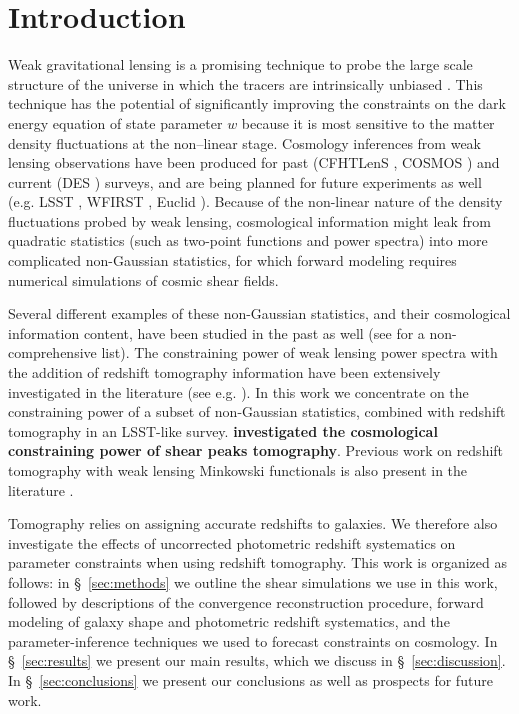 \documentclass[reprint,aps,prd,superscriptaddress,showkeys,showpacs]{revtex4-1}
\begin{document}
\maketitle



\section{Introduction}
%
Weak gravitational lensing is a promising technique to probe the large scale structure of the universe in which the tracers are intrinsically unbiased \citep{wlreview}. This technique has the potential of significantly improving the constraints on the dark energy equation of state parameter $w$ because it is most sensitive to the matter density fluctuations at the non--linear stage. Cosmology inferences from weak lensing observations have been produced for past (CFHTLenS \citep{cfht1}, COSMOS \citep{cosmos}) and current (DES \citep{DES}) surveys, and are being planned for future experiments as well (e.g. LSST \citep{LSST}, WFIRST \citep{WFIRST}, Euclid \citep{Euclid}). Because of the non-linear nature of the density fluctuations probed by weak lensing, cosmological information might leak from quadratic statistics (such as two-point functions and power spectra) into more complicated non-Gaussian statistics, for which forward modeling requires numerical simulations of cosmic shear fields. 

Several different examples of these non-Gaussian statistics, and their cosmological information content, have been studied in the past as well (see \citep{MinkJan,PeaksJan,NG-Marian,NG-Jain1,NG-Jain2,NG-Jain3,NG-Refregier,NG-Dietrich} for a non-comprehensive list). The constraining power of weak lensing power spectra with the addition of redshift tomography information have been extensively investigated in the literature (see e.g. \citep{SongKnox,FangHaiman07,Huterer2006}). In this work we concentrate on the constraining power of a subset of non-Gaussian statistics, combined with redshift tomography in an LSST-like survey. {\bf \color{red} \citep{MartinetPeaksTomo} investigated the cosmological constraining power of shear peaks tomography}. Previous work on redshift tomography with weak lensing Minkowski functionals is also present in the literature \citep{MinkJan}. 

Tomography relies on assigning accurate redshifts to galaxies. We therefore also investigate the effects of uncorrected photometric redshift systematics on parameter constraints when using redshift tomography. This work is organized as follows: in \S~\ref{sec:methods} we outline the shear simulations we use in this work, followed by descriptions of the convergence reconstruction procedure, forward modeling of galaxy shape and photometric redshift systematics, and the parameter-inference techniques we used to forecast constraints on cosmology. In \S~\ref{sec:results} we present our main results, which we discuss in \S~\ref{sec:discussion}. In \S~\ref{sec:conclusions} we present our conclusions as well as prospects for future work.  
\end{document}

